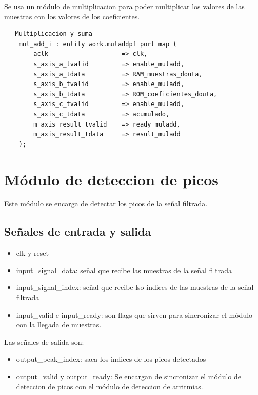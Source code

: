 Se usa un módulo de multiplicacion para poder multiplicar los valores de las muestras con los valores de los coeficientes.

\lstset{language=VHDL, breaklines=true, basicstyle=\footnotesize}
\begin{lstlisting}[frame=single] 
    -- Multiplicacion y suma 
    mul_add_i : entity work.muladdpf port map (
        aclk                    => clk,
        s_axis_a_tvalid         => enable_muladd,
        s_axis_a_tdata          => RAM_muestras_douta,
        s_axis_b_tvalid         => enable_muladd,
        s_axis_b_tdata          => ROM_coeficientes_douta,
        s_axis_c_tvalid         => enable_muladd,
        s_axis_c_tdata          => acumulado,                
        m_axis_result_tvalid    => ready_muladd,
        m_axis_result_tdata     => result_muladd
    );
\end{lstlisting}

\section{Módulo de deteccion de picos}

Este módulo se encarga de detectar los picos de la señal filtrada. 
\subsection{Señales de entrada y salida}
    \begin{itemize}
    \item clk y reset
    \item input\_signal\_data: señal que recibe las muestras de la señal filtrada 
    \item input\_signal\_index: señal que recibe lso indices de las muestras de la señal filtrada 
    \item input\_valid e input\_ready: son flags que sirven para sincronizar el módulo con la llegada de muestras. 
    \end{itemize}
    
    Las señales de salida son:
    
    \begin{itemize}
        \item output\_peak\_index: saca los indices de los picos detectados
        \item output\_valid y output\_ready: Se encargan de sincronizar el módulo de deteccion de picos 
        con el módulo de deteccion de arritmias.
    \end{itemize}

